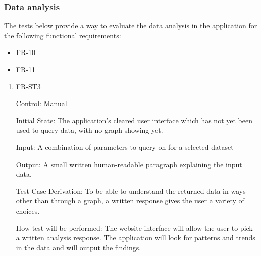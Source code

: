 \documentclass[12pt, titlepage]{article}
\begin{document}
\subsubsection{Data analysis}
    The tests below provide a way to evaluate the data analysis in the application for the following functional requirements:
    \begin{itemize}
      \item FR-10
      \item FR-11
    \end{itemize}
      \begin{enumerate}
      
        \item{FR-ST3}
        
        Control: Manual
                  
        Initial State: The application's cleared user interface which has not yet been used to query data, with no graph showing yet.
                  
        Input: A combination of parameters to query on for a selected dataset
                  
        Output: A small written human-readable paragraph explaining the input data.
       
        Test Case Derivation: To be able to understand the returned data in ways other than through a graph, a written response gives the user a variety of choices.
                 
        How test will be performed: The website interface will allow the user to pick a written analysis response. The application will look for patterns and trends in the data and will output the findings. 
        
        \end{enumerate}
\end{document}
